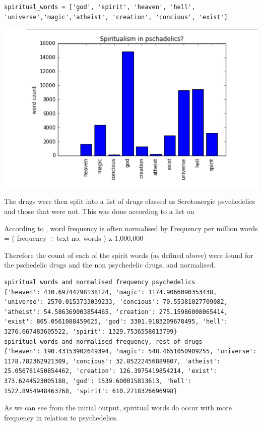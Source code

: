 \documentclass{article}
\begin{document}
\begin{lstlisting}
spiritual_words = ['god', 'spirit', 'heaven', 'hell', 'universe','magic','atheist', 'creation', 'concious', 'exist']
\end{lstlisting}

\includegraphics{spriritwords_cropped}

The drugs were then split into a list of drugs classed as Serotonergic psychedelics and those that were not. This was done according to a list on \cite{wiki}

According to \cite{Lancaster}, word frequency is often normalised by Frequency per million words = ( frequency ÷ text no. words ) x 1,000,000 

Therefore the count of each of the spirit words (as defined above) were found for the pschedelic drugs and the non psychedelic drugs, and normalised. 

\begin{lstlisting}
spiritual words and normalised frequency psychedelics
{'heaven': 410.69744298138124, 'magic': 1174.9066090353438, 'universe': 2570.0153733039233, 'concious': 70.55381027709082, 'atheist': 54.586369003854465, 'creation': 275.15986008065414, 'exist': 805.0561088459625, 'god': 3301.9183209678495, 'hell': 3276.667483605522, 'spirit': 1329.7536558013799}
spiritual words and normalised frequency, rest of drugs
{'heaven': 190.43153902649394, 'magic': 548.4651050909255, 'universe': 1178.782362921309, 'concious': 32.85222456889807, 'atheist': 25.056781450854462, 'creation': 126.3975419854214, 'exist': 373.6244523005188, 'god': 1539.600015813613, 'hell': 1522.8954948463768, 'spirit': 610.2718326696998}
\end{lstlisting}

As we can see from the initial output, spiritual words do occur with more frequency in relation to psychedelics.
\end{document}
